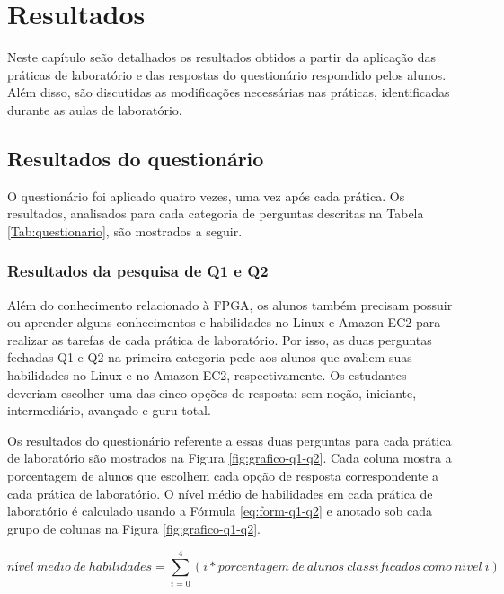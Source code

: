 \chapter{Resultados}
\label{chap:resultados}

Neste capítulo seão detalhados os resultados obtidos a partir da aplicação das práticas de laboratório e das respostas do questionário respondido pelos alunos. Além disso, são discutidas as modificações necessárias nas práticas, identificadas durante as aulas de laboratório. 

\section{Resultados do questionário}\label{sec:resultados-dos-questionarios}

O questionário foi aplicado quatro vezes, uma vez após cada prática. Os resultados, analisados para cada categoria de perguntas descritas na Tabela \ref{Tab:questionario}, são mostrados a seguir.

\subsection{Resultados da pesquisa de Q1 e Q2}

Além do conhecimento relacionado à FPGA, os alunos também precisam possuir ou aprender alguns conhecimentos e habilidades no Linux e Amazon EC2 para realizar as tarefas de cada prática de laboratório. Por isso, as duas perguntas fechadas Q1 e Q2 na primeira categoria pede aos alunos que avaliem suas habilidades no Linux e no Amazon EC2, respectivamente. Os estudantes deveriam escolher uma das cinco opções de resposta: sem noção, iniciante, intermediário, avançado e guru total.

Os resultados do questionário referente a essas duas perguntas para cada prática de laboratório são mostrados na Figura \ref{fig:grafico-q1-q2}. Cada coluna mostra a porcentagem de alunos que escolhem cada opção de resposta correspondente a cada prática de laboratório. O nível médio de habilidades em cada prática de laboratório é calculado usando a Fórmula \ref{eq:form-q1-q2} e anotado sob cada grupo de colunas na Figura \ref{fig:grafico-q1-q2}.

\begin{equation}\label{eq:form-q1-q2}
nível \ medio \ de \ habilidades = \sum_{i=0}^{4} (i*porcentagem \ de \ alunos \ classificados \ como \ nivel \ i)
\end{equation}


